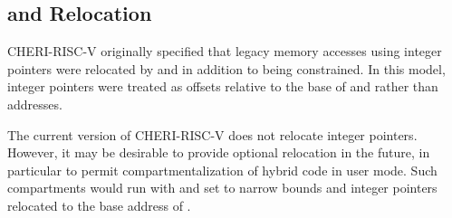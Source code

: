\subsection{\DDC{} and \PCC{} Relocation}

CHERI-RISC-V originally specified that legacy memory accesses using
integer pointers were relocated by \DDC{} and \PCC{} in addition to
being constrained.  In this model, integer pointers were treated as
offsets relative to the base of \DDC{} and \PCC{} rather than
addresses.

The current version of CHERI-RISC-V does not relocate integer
pointers.  However, it may be desirable to provide optional relocation
in the future, in particular to permit compartmentalization of hybrid
code in user mode.  Such compartments would run with \DDC{} and \PCC{}
set to narrow bounds and integer pointers relocated to the base
address of \DDC{}.

